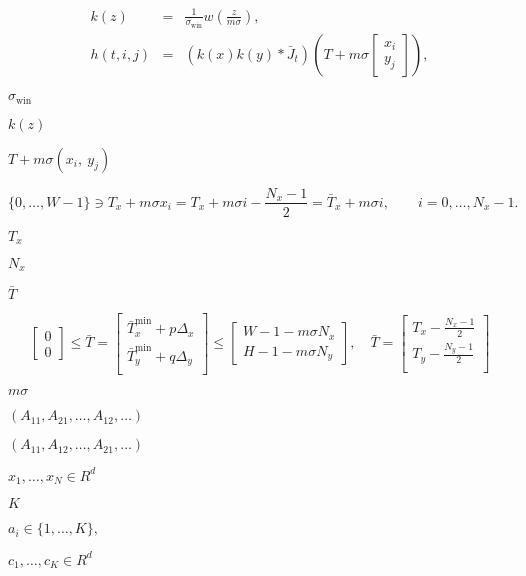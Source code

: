 \documentclass{article}
\begin{document}
\begin{eqnarray*} k(z) &=& \frac{1}{\sigma_{\mathrm{win}}} w\left(\frac{z}{m\sigma}\right), \\ h(t,i,j) &=& (k(x)k(y) * \bar J_t)\left( T + m\sigma \left[\begin{array}{cc} x_i \\ y_j \end{array}\right] \right), \end{eqnarray*}
\pagebreak

$ \sigma_\mathrm{win} $
\pagebreak

$ k(z) $
\pagebreak

$ T + m\sigma (x_i,\ y_j) $
\pagebreak

\[ \{0,\dots, W-1\} \ni T_x + m\sigma x_i = T_x + m\sigma i - \frac{N_x-1}{2} = \bar T_x + m\sigma i, \qquad i = 0,\dots,N_x-1. \]
\pagebreak

$ T_x $
\pagebreak

$ N_x $
\pagebreak

$ \bar T $
\pagebreak

\[ \left[\begin{array}{cc} 0 \\ 0 \end{array}\right] \leq \bar T = \left[\begin{array}{cc} \bar T_x^{\min} + p \Delta_x \\ \bar T_y^{\min} + q \Delta_y \\ \end{array}\right] \leq \left[\begin{array}{cc} W - 1 - m\sigma N_x \\ H - 1 - m\sigma N_y \end{array}\right], \quad \bar T = \left[\begin{array}{cc} T_x - \frac{N_x - 1}{2} \\ T_y - \frac{N_y - 1}{2} \\ \end{array}\right] \]
\pagebreak

$ m \sigma $
\pagebreak

$(A_{11}, A_{21}, \dots, A_{12}, \dots)$
\pagebreak

$(A_{11}, A_{12}, \dots, A_{21}, \dots)$
\pagebreak

$x_1,\dots,x_N\in R^d$
\pagebreak

$K$
\pagebreak

$a_i\in\{1,\dots,K\},$
\pagebreak

$c_1,\dots,c_K\in R^d$
\pagebreak
\end{document}
